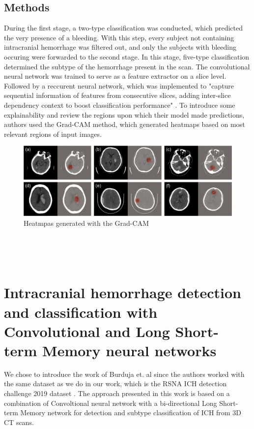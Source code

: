 \subsection*{Methods}
During the first stage, a two-type classification was conducted, which predicted the very presence of a bleeding. With this step, every subject not containing intracranial hemorrhage was filtered out, and only the subjects with bleeding occuring were forwarded to the second stage. In this stage, five-type classification determined the subtype of the hemorrhage present in the scan. The convolutional neural network was trained to serve as a feature extractor on a slice level. Followed by a reccurent neural network, which was implemented to "capture sequential information of features from consecutive slices, adding inter-slice dependency context to boost classification performance" \cite{relatedWork2}. To introduce some explainability and review the regions upon which their model made predictions, authors used the Grad-CAM method, which generated heatmaps based on most relevant regions of input images.
\begin{figure}[!ht]
\begin{centering}
\includegraphics[width=15cm]{assets/images/RW2.jpg}
\par\end{centering}
\caption{Heatmpas generated with the Grad-CAM  \label{fig:rw2}}
\end{figure}
\\
\\
\\
\section{Intracranial hemorrhage detection and classification with Convolutional and Long Short-term Memory neural networks}
We chose to introduce the work of Burduja et. al \cite{relatedWork3} since the authors worked with the same dataset as we do in our work, which is the RSNA ICH detection challenge 2019 dataset \cite{RSNAchallenge}. The approach presented in this work is based on a combination of Convoltional neural network with a bi-directional Long Short-term Memory network for detection and subtype classification of ICH from 3D CT scans.
